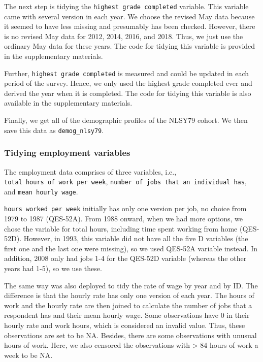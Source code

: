 \documentclass{article}
\begin{document}
The next step is tidying the \texttt{highest\ grade\ completed} variable. This variable came with several version in each year. We choose the revised May data because it seemed to have less missing and presumably has been checked. However, there is no revised May data for 2012, 2014, 2016, and 2018. Thus, we just use the ordinary May data for these years. The code for tidying this variable is provided in the supplementary materials.

Further, \texttt{highest\ grade\ completed} is measured and could be updated in each period of the survey. Hence, we only used the highest grade completed ever and derived the year when it is completed. The code for tidying this variable is also available in the supplementary materials.

Finally, we get all of the demographic profiles of the NLSY79 cohort. We then save this data as \texttt{demog\_nlsy79}.

\hypertarget{tidyemp}{%
\subsubsection{Tidying employment variables}\label{tidyemp}}

The employment data comprises of three variables, i.e., \texttt{total\ hours\ of\ work\ per\ week}, \texttt{number\ of\ jobs\ that\ an\ individual\ has}, and \texttt{mean\ hourly\ wage}.

\texttt{hours\ worked\ per\ week} initially has only one version per job, no choice from 1979 to 1987 (QES-52A). From 1988 onward, when we had more options, we chose the variable for total hours, including time spent working from home (QES-52D). However, in 1993, this variable did not have all the five D variables (the first one and the last one were missing), so we used QES-52A variable instead. In addition, 2008 only had jobs 1-4 for the QES-52D variable (whereas the other years had 1-5), so we use these.

The same way was also deployed to tidy the rate of wage by year and by ID. The difference is that the hourly rate has only one version of each year. The hours of work and the hourly rate are then joined to calculate the number of jobs that a respondent has and their mean hourly wage. Some observations have 0 in their hourly rate and work hours, which is considered an invalid value. Thus, these observations are set to be NA. Besides, there are some observations with unusual hours of work. Here, we also censored the observations with \textgreater{} 84 hours of work a week to be NA.
\end{document}
